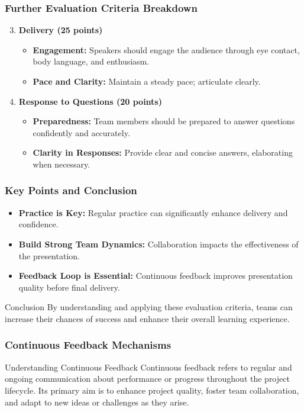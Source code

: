 \documentclass[aspectratio=169]{beamer}
\begin{document}
\begin{frame}[fragile]
    \frametitle{Further Evaluation Criteria Breakdown}
    \begin{enumerate}
        \setcounter{enumi}{2} %
        \item \textbf{Delivery (25 points)}
        \begin{itemize}
            \item \textbf{Engagement:} Speakers should engage the audience through eye contact, body language, and enthusiasm.
            \item \textbf{Pace and Clarity:} Maintain a steady pace; articulate clearly.
        \end{itemize}

        \item \textbf{Response to Questions (20 points)}
        \begin{itemize}
            \item \textbf{Preparedness:} Team members should be prepared to answer questions confidently and accurately.
            \item \textbf{Clarity in Responses:} Provide clear and concise answers, elaborating when necessary.
        \end{itemize}
    \end{enumerate}
\end{frame}

\begin{frame}[fragile]
    \frametitle{Key Points and Conclusion}
    \begin{itemize}
        \item \textbf{Practice is Key:} Regular practice can significantly enhance delivery and confidence.
        \item \textbf{Build Strong Team Dynamics:} Collaboration impacts the effectiveness of the presentation.
        \item \textbf{Feedback Loop is Essential:} Continuous feedback improves presentation quality before final delivery.
    \end{itemize}
    \begin{block}{Conclusion}
        By understanding and applying these evaluation criteria, teams can increase their chances of success 
        and enhance their overall learning experience.
    \end{block}
\end{frame}

\begin{frame}[fragile]
    \frametitle{Continuous Feedback Mechanisms}
    \begin{block}{Understanding Continuous Feedback}
        Continuous feedback refers to regular and ongoing communication about performance or progress throughout the project lifecycle. 
        Its primary aim is to enhance project quality, foster team collaboration, and adapt to new ideas or challenges as they arise.
    \end{block}
\end{frame}
\end{document}
